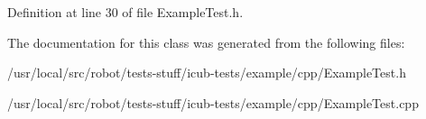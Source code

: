 Definition at line 30 of file Example\-Test.\-h.



The documentation for this class was generated from the following files\-:\begin{DoxyCompactItemize}
\item 
/usr/local/src/robot/tests-\/stuff/icub-\/tests/example/cpp/Example\-Test.\-h\item 
/usr/local/src/robot/tests-\/stuff/icub-\/tests/example/cpp/Example\-Test.\-cpp\end{DoxyCompactItemize}
